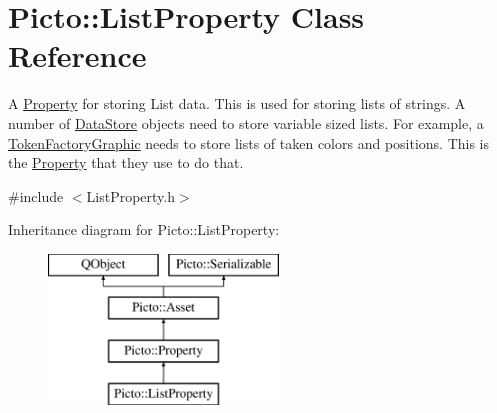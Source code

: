 \hypertarget{class_picto_1_1_list_property}{\section{Picto\-:\-:List\-Property Class Reference}
\label{class_picto_1_1_list_property}
}


A \hyperlink{class_picto_1_1_property}{Property} for storing List data. This is used for storing lists of strings. A number of \hyperlink{class_picto_1_1_data_store}{Data\-Store} objects need to store variable sized lists. For example, a \hyperlink{class_picto_1_1_token_factory_graphic}{Token\-Factory\-Graphic} needs to store lists of taken colors and positions. This is the \hyperlink{class_picto_1_1_property}{Property} that they use to do that.  




{\ttfamily \#include $<$List\-Property.\-h$>$}

Inheritance diagram for Picto\-:\-:List\-Property\-:\begin{figure}[H]
\begin{center}
\leavevmode
\includegraphics[height=4.000000cm]{class_picto_1_1_list_property}
\end{center}
\end{figure}

